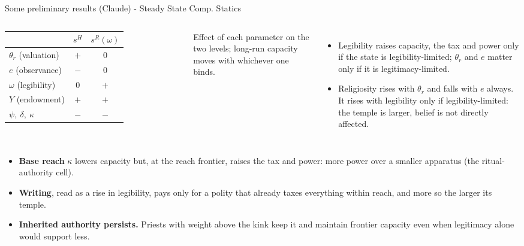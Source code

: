 \documentclass[11pt,aspectratio=169]{beamer}
\begin{document}
\begin{frame}{Some preliminary results (Claude) - Steady State Comp. Statics}
\begin{columns}[T]
\centering
\begin{tabular}{lcc}
\toprule
 & $s^H$ & $s^R(\omega)$\\
\midrule
$\theta_r$ (valuation) & $+$ & $0$\\
$e$ (observance) & $-$ & $0$\\
$\omega$ (legibility) & $0$ & $+$\\
$Y$ (endowment) & $+$ & $+$\\
$\psi,\ \delta,\ \kappa$ & $-$ & $-$\\
\bottomrule
\end{tabular}

\smallskip
\raggedright\footnotesize
Effect of each parameter on the two levels; long-run capacity moves with whichever one binds.
\begin{itemize}
\item Legibility raises capacity, the tax and power only if the state is legibility-limited;
$\theta_r$ and $e$ matter only if it is legitimacy-limited.
\item Religiosity rises with $\theta_r$ and falls with $e$ always. It rises with legibility only if
legibility-limited: the temple is larger, belief is not directly affected.
\end{itemize}
\end{columns}
\medskip
\begin{itemize}
\item \textbf{Base reach} $\kappa$ lowers capacity but, at the reach frontier, raises the tax and
power: more power over a smaller apparatus (the ritual-authority cell).
\item \textbf{Writing}, read as a rise in legibility, pays only for a polity that already taxes
everything within reach, and more so the larger its temple.
\item \textbf{Inherited authority persists.} Priests with weight above the kink keep it and maintain
frontier capacity even when legitimacy alone would support less.
\end{itemize}
\end{frame}

\end{document}
